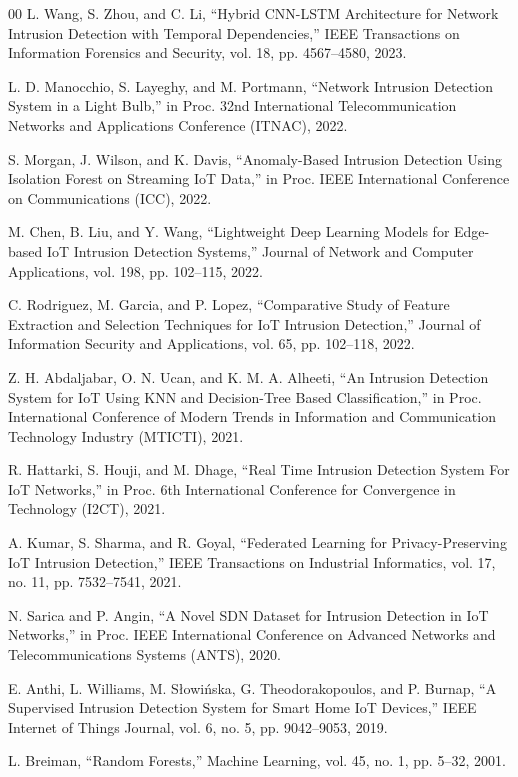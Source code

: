 \documentclass[conference]{IEEEtran}
\begin{document}
\begin{thebibliography}{00}
 L. Wang, S. Zhou, and C. Li, ``Hybrid CNN-LSTM Architecture for Network Intrusion Detection with Temporal Dependencies,'' IEEE Transactions on Information Forensics and Security, vol. 18, pp. 4567--4580, 2023.

 L. D. Manocchio, S. Layeghy, and M. Portmann, ``Network Intrusion Detection System in a Light Bulb,'' in Proc. 32nd International Telecommunication Networks and Applications Conference (ITNAC), 2022.

 S. Morgan, J. Wilson, and K. Davis, ``Anomaly-Based Intrusion Detection Using Isolation Forest on Streaming IoT Data,'' in Proc. IEEE International Conference on Communications (ICC), 2022.

 M. Chen, B. Liu, and Y. Wang, ``Lightweight Deep Learning Models for Edge-based IoT Intrusion Detection Systems,'' Journal of Network and Computer Applications, vol. 198, pp. 102--115, 2022.

 C. Rodriguez, M. Garcia, and P. Lopez, ``Comparative Study of Feature Extraction and Selection Techniques for IoT Intrusion Detection,'' Journal of Information Security and Applications, vol. 65, pp. 102--118, 2022.

 Z. H. Abdaljabar, O. N. Ucan, and K. M. A. Alheeti, ``An Intrusion Detection System for IoT Using KNN and Decision-Tree Based Classification,'' in Proc. International Conference of Modern Trends in Information and Communication Technology Industry (MTICTI), 2021.

 R. Hattarki, S. Houji, and M. Dhage, ``Real Time Intrusion Detection System For IoT Networks,'' in Proc. 6th International Conference for Convergence in Technology (I2CT), 2021.

 A. Kumar, S. Sharma, and R. Goyal, ``Federated Learning for Privacy-Preserving IoT Intrusion Detection,'' IEEE Transactions on Industrial Informatics, vol. 17, no. 11, pp. 7532--7541, 2021.

 N. Sarica and P. Angin, ``A Novel SDN Dataset for Intrusion Detection in IoT Networks,'' in Proc. IEEE International Conference on Advanced Networks and Telecommunications Systems (ANTS), 2020.

 E. Anthi, L. Williams, M. Słowińska, G. Theodorakopoulos, and P. Burnap, ``A Supervised Intrusion Detection System for Smart Home IoT Devices,'' IEEE Internet of Things Journal, vol. 6, no. 5, pp. 9042--9053, 2019.

 L. Breiman, ``Random Forests,'' Machine Learning, vol. 45, no. 1, pp. 5--32, 2001.


\end{thebibliography}
\end{document}
